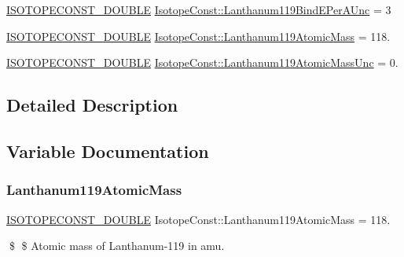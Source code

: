 \begin{DoxyCompactItemize}
\mbox{\hyperlink{group___isotope_const-_macros_ga8f45a7272ce02c0b4c65c44636ed719a}{I\+S\+O\+T\+O\+P\+E\+C\+O\+N\+S\+T\+\_\+\+D\+O\+U\+B\+LE}} \mbox{\hyperlink{group___isotope_const-_lanthanum-_la119_ga63efb6c7209c4b046e0e4139fc001515}{Isotope\+Const\+::\+Lanthanum119\+Bind\+E\+Per\+A\+Unc}} = 3
\item 
\mbox{\hyperlink{group___isotope_const-_macros_ga8f45a7272ce02c0b4c65c44636ed719a}{I\+S\+O\+T\+O\+P\+E\+C\+O\+N\+S\+T\+\_\+\+D\+O\+U\+B\+LE}} \mbox{\hyperlink{group___isotope_const-_lanthanum-_la119_ga13cec4ed9c5686c7dc753da6eab01683}{Isotope\+Const\+::\+Lanthanum119\+Atomic\+Mass}} = 118.
\item 
\mbox{\hyperlink{group___isotope_const-_macros_ga8f45a7272ce02c0b4c65c44636ed719a}{I\+S\+O\+T\+O\+P\+E\+C\+O\+N\+S\+T\+\_\+\+D\+O\+U\+B\+LE}} \mbox{\hyperlink{group___isotope_const-_lanthanum-_la119_gade74481abdc0698acfa421e2dbb2cebd}{Isotope\+Const\+::\+Lanthanum119\+Atomic\+Mass\+Unc}} = 0.
\end{DoxyCompactItemize}


\subsection{Detailed Description}


\subsection{Variable Documentation}
\mbox{\label{group___isotope_const-_lanthanum-_la119_ga13cec4ed9c5686c7dc753da6eab01683}} 
\subsubsection{\texorpdfstring{Lanthanum119\+Atomic\+Mass}{Lanthanum119AtomicMass}}
{\footnotesize\ttfamily \mbox{\hyperlink{group___isotope_const-_macros_ga8f45a7272ce02c0b4c65c44636ed719a}{I\+S\+O\+T\+O\+P\+E\+C\+O\+N\+S\+T\+\_\+\+D\+O\+U\+B\+LE}} Isotope\+Const\+::\+Lanthanum119\+Atomic\+Mass = 118.}

\$ \$ Atomic mass of Lanthanum-\/119 in amu. \mbox{\label{group___isotope_const-_lanthanum-_la119_gade74481abdc0698acfa421e2dbb2cebd}} 
